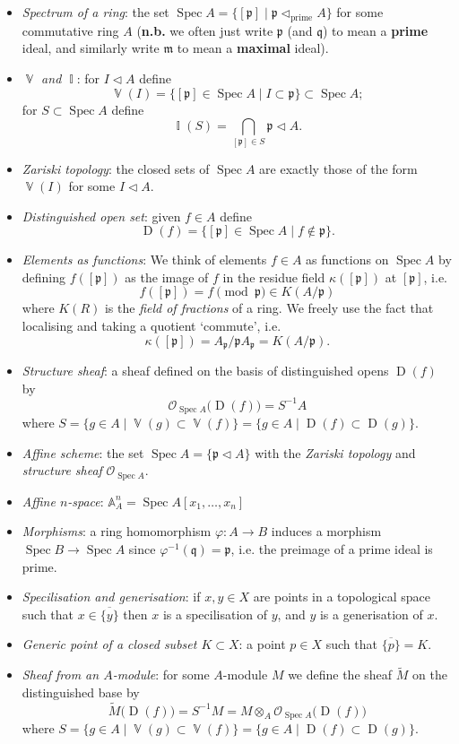 \documentclass[10pt]{article}
\DeclareMathOperator{\Spec}{Spec}
\DeclareMathOperator{\V}{\mathbb{V}}
\DeclareMathOperator{\I}{\mathbb{I}}
\DeclareMathOperator{\D}{D}
\renewcommand{\O}{\mathcal{O}}
\newcommand{\prid}{\mathfrak{p}}
\newcommand{\maid}{\mathfrak{m}}
\newcommand{\A}{\mathbb{A}}
\newcommand{\ideal}{\triangleleft}
\begin{document}
                \begin{itemize}
                    \item \textit{Spectrum of a ring}: the set $\Spec A=\{[\prid] \mid \prid\ideal_{\mathrm{prime}} A\}$ for some commutative ring $A$ (\textbf{n.b.} we often just write $\prid$ (and $\mathfrak{q}$) to mean a \textbf{prime} ideal, and similarly write $\maid$ to mean a \textbf{maximal} ideal).
                    \item \textit{$\V$ and $\I$}: for $I\ideal A$ define \[\V(I)=\{[\prid]\in\Spec A \mid I\subset\prid\}\subset\Spec A;\] for $S\subset\Spec A$ define \[\I(S)=\bigcap_{[\prid]\in S}\prid\ideal A.\]
                    \item \textit{Zariski topology}: the closed sets of $\Spec A$ are exactly those of the form $\V(I)$ for some $I\ideal A$.
                    \item \textit{Distinguished open set}: given $f\in A$ define \[\D(f)=\{[\prid]\in\Spec A \mid f\not\in\prid\}.\]
                    \item \textit{Elements as functions}: We think of elements $f\in A$ as functions on $\Spec A$ by defining $f([\prid])$ as the image of $f$ in the residue field $\kappa([\prid])$ at $[\prid]$, i.e. \[f([\prid])=f\pmod\prid\in K(A/\prid)\]
                        where $K(R)$ is the \textit{field of fractions} of a ring.
                        We freely use the fact that localising and taking a quotient `commute', i.e. \[\kappa([\prid])=A_\prid/\prid A_\prid = K(A/\prid).\]
                    \item \textit{Structure sheaf}: a sheaf defined on the basis of distinguished opens $\D(f)$ by \[\O_{\Spec A}\big(\D(f)\big)=S^{-1}A\] where $S=\{g\in A \mid \V(g)\subset\V(f)\}=\{g\in A \mid \D(f)\subset\D(g)\}$.
                    \item \textit{Affine scheme}: the set $\Spec A=\{\prid\ideal A\}$ with the \textit{Zariski topology} and \textit{structure sheaf} $\O_{\Spec A}$.
                    \item \textit{Affine $n$-space}: $\A_A^n=\Spec A[x_1,\ldots,x_n]$
                    \item \textit{Morphisms}: a ring homomorphism $\varphi\colon A\to B$ induces a morphism $\Spec B\to\Spec A$ since $\varphi^{-1}(\mathfrak{q})=\prid$, i.e. the preimage of a prime ideal is prime.
                    \item \textit{Specilisation and generisation}: if $x,y\in X$ are points in a topological space such that $x\in\overline{\{y\}}$ then $x$ is a specilisation of $y$, and $y$ is a generisation of $x$.
                    \item \textit{Generic point of a closed subset $K\subset X$}: a point $p\in X$ such that $\overline{\{p\}}=K$.
                    \item \textit{Sheaf from an $A$-module}: for some $A$-module $M$ we define the sheaf $\widetilde{M}$ on the distinguished base by \[\widetilde{M}\big(\D(f)\big)=S^{-1}M=M\otimes_A\O_{\Spec A}\big(\D(f)\big)\] where $S=\{g\in A \mid \V(g)\subset\V(f)\}=\{g\in A \mid \D(f)\subset\D(g)\}$.
                \end{itemize}
        
\end{document}
